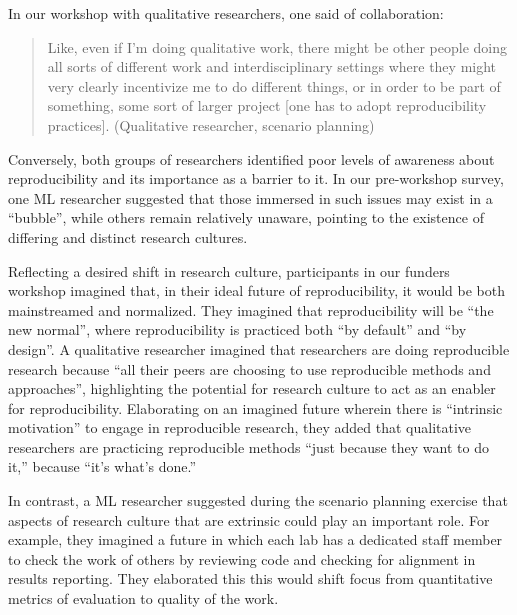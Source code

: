 \documentclass[authordate, meta]{jote-new-article}
\begin{document}
	In our workshop with qualitative researchers, one said of collaboration:



	\begin{quote}Like, even if I'm doing qualitative work, there might be other people doing all sorts of different work and interdisciplinary settings where they might very clearly incentivize me to do different things, or in order to be part of something, some sort of larger project [one has to adopt reproducibility practices]. (Qualitative researcher, scenario planning)\end{quote}



	Conversely, both groups of researchers identified poor levels of awareness about reproducibility and its importance as a barrier to it. In our pre-workshop survey, one ML researcher suggested that those immersed in such issues may exist in a “bubble”, while others remain relatively unaware, pointing to the existence of differing and distinct research cultures.



	Reflecting a desired shift in research culture, participants in our funders workshop imagined that, in their ideal future of reproducibility, it would be both mainstreamed and normalized. They imagined that reproducibility will be “the new normal”, where reproducibility is practiced both “by default” and “by design”. A qualitative researcher imagined that researchers are doing reproducible research because “all their peers are choosing to use reproducible methods and approaches”, highlighting the potential for research culture to act as an enabler for reproducibility. Elaborating on an imagined future wherein there is “intrinsic motivation” to engage in reproducible research, they added that qualitative researchers are practicing reproducible methods “just because they want to do it,” because “it's what's done.”



	In contrast, a ML researcher suggested during the scenario planning exercise that aspects of research culture that are extrinsic could play an important role. For example, they imagined a future in which each lab has a dedicated staff member to check the work of others by reviewing code and checking for alignment in results reporting. They elaborated this this would shift focus from quantitative metrics of evaluation to quality of the work.
\end{document}

